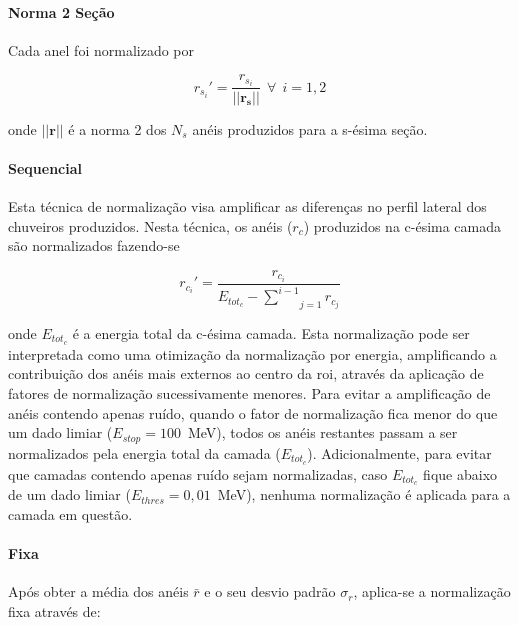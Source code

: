 \paragraph{Norma 2 Seção}
\label{par:norm_secao}

Cada anel foi normalizado por

\begin{equation}
r_{s_i}' = \frac{r_{s_i}}{||\mathbf{r_s}||}~~\forall~~i=1,2
\end{equation}


\noindent onde $||\mathbf{r}||$ é a norma 2 dos $N_s$ anéis produzidos para a
s-ésima seção.

\paragraph{Sequencial}
\label{par:norm_seq}

Esta técnica de normalização visa amplificar as diferenças no perfil lateral dos chuveiros produzidos. 
Nesta técnica, os anéis ($r_c$) produzidos na c-ésima camada são normalizados fazendo-se

\begin{equation}
\label{eq:normalizacao_sequencial}
r_{c_{i}}' = \frac{r_{c_{i}}}{ E_{tot_{c}} - \underset{j=1}{\overset{i-1}{\sum}} r_{c_{j}} }
\end{equation}

\noindent onde $E_{tot_{c}}$ é a energia total da c-ésima camada. Esta normalização pode ser interpretada 
como uma otimização da normalização por energia, amplificando a contribuição dos anéis mais 
externos ao centro da \gls{roi}, através da aplicação de fatores de normalização sucessivamente menores. Para 
evitar a amplificação de anéis contendo apenas ruído, quando o fator de normalização fica menor do que 
um dado limiar  ($E_{stop} = 100$~MeV), todos os anéis restantes passam a ser normalizados pela energia 
total da camada ($E_{tot_{c}}$). Adicionalmente, para evitar que camadas contendo apenas ruído sejam 
normalizadas, caso $E_{tot_{c}}$ fique abaixo de um dado limiar ($E_{thres} = 0,01$~MeV), nenhuma 
normalização é aplicada para a camada em questão.

\paragraph{Fixa}

Após obter a média dos anéis $\bar{r}$ e o seu desvio padrão $\sigma_{r}$,
aplica-se a normalização fixa através de:

